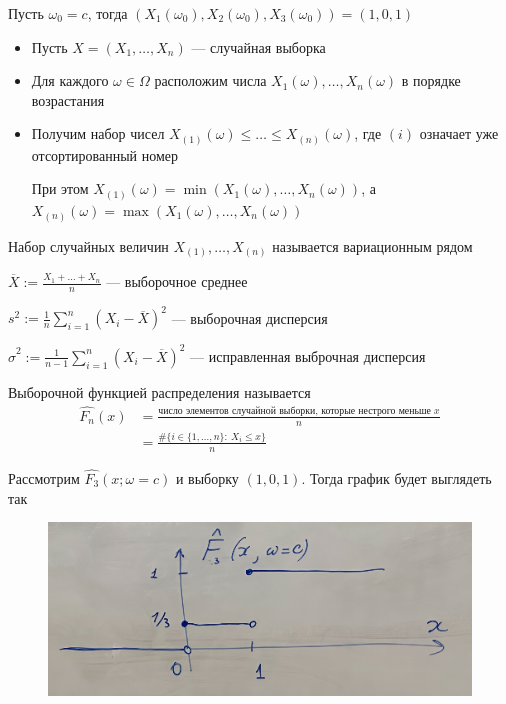 \documentclass[a4paper, 10pt]{article}
\begin{document}
Пусть $\omega_0=c$, тогда $\left(X_1(\omega_0),X_2(\omega_0),X_3(\omega_0)\right)=(1,0,1)$

\begin{itemize}
    \item Пусть $X=(X_1,\ldots,X_n)$ — случайная выборка
    \item Для каждого $\omega\in\Omega$ расположим числа $X_1(\omega),\ldots,X_n(\omega)$ в порядке возрастания
    \item Получим набор чисел $X_{(1)}(\omega)\leqslant\ldots\leqslant X_{(n)}(\omega)$, где $(i)$ означает уже отсортированный номер
    
    При этом $X_{(1)}(\omega)=\min(X_1(\omega),\ldots,X_n(\omega))$, а $X_{(n)}(\omega)=\max(X_1(\omega),\ldots,X_n(\omega))$
\end{itemize}

 Набор случайных величин $X_{(1)},\ldots,X_{(n)}$ называется вариационным рядом

 $\overline{X}:=\displaystyle\frac{X_1+\ldots+X_n}{n}$ — выборочное среднее

 $s^2:=\displaystyle\frac{1}{n}\sum_{i=1}^n (X_i-\overline{X})^2$ — выборочная дисперсия

 $\widehat{\sigma}^2:=\displaystyle\frac{1}{n-1}\sum_{i=1}^n (X_i-\overline{X})^2$ — исправленная выброчная дисперсия

 Выборочной функцией распределения называется \begin{equation*}
    \begin{aligned}
        \hat{F_n}(x)&=\displaystyle\frac{\text{число элементов случайной выборки, которые нестрого меньше } x}{n}\\
        &=\frac{\#\{i\in\{1,\ldots,n\}:\ X_i\leqslant x\}}{n}
    \end{aligned}
\end{equation*}

\ex Рассмотрим $\hat{F_3}(x;\omega=c)$ и выборку $(1,0,1)$. Тогда график будет выглядеть так

\begin{figure}[h]
    \centering
    \includegraphics[width=0.6\linewidth]{intro-to-stat.png}
\end{figure}
\end{document}
